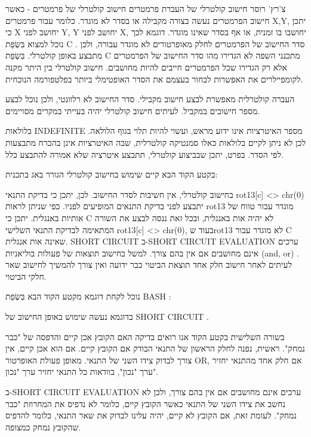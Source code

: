 \begin{טבלא}[!htbp]
        צ'רץ' רוסר
        חישוב קולטרלי של העברת פרמטרים
        חישוב קולטרלי של פרמטרים - כאשר חישוב הפרמטרים נעשה בצורה מקבילה או בסדר לא מוגדר. כלומר עבור פרמטרים X,Y, יתכן כי X יחושב לפני Y, Y יחושב לפני X, יחושבו בו זמנית, או אף בסדר שאינו מוגדר. דוגמא לכך נוכל למצוא בִּשְׂפַת C . סדר החישוב של הפרמטרים לחלק מאופרטורים לא מוגדר עבורה, ולכן מתבצע באופן קולטרלי.
        בִּשְׂפַת C מתכנני השפה לא הגדירו מהו סדר החישוב של הפרמטרים אלא רק הגדירו שכל הפרמטרים חייבים להיות מחושבים. חישוב קולטרלי בין היתר מקנה לקומפיילרים את האפשרות לבחור בעצמם את הסדר האופטימלי ביותר בפלטפורמה הנוכחית.

        העברה קולטרלית מאפשרת לבצע חישוב מקבילי. סדר החישוב לא רלוונטי, ולכן נוכל לבצע מספר חישובים במקביל. לעיתים חישוב קולטרלי יהיה בעייתי במקרים מסויימים.

        בלולאות INDEFINITE מספר האיטרציות אינו ידוע מראש, ועשוי להיות תלוי בגוף הלולאה. לכן לא ניתן לקיים בלולאות כאלו סמנטיקה קולטרלית, שבה האיטרציות אינן בהכרח מתבצעות לפי הסדר. בפרט, יתכן שבביצוע קולטרלי, תתבצע איטרציה שלא אמורה להתבצע כלל.

        בקטע הקוד הבא קיים שימוש בחישוב קולטרלי הגורר באג בתכנית:

        בחישוב קולטרלי, אין חשיבות לסדר החישוב. לכן, יתכן כי בדיקת התנאי rot13[c] <> chr(0) יתבצע לפני בדיקת התנאים המופיעים לפניו. כפי שניתן לראות rot13 מוגדר עבור טווח של אותיות באנגלית. יתכן כי C לא יהיה אות באנגלית, ובכל זאת ננסה לבצע את השורה המתאימה לבדיקת התנאי השלישי rot13[c] <> chr(0), בעוד שrot13 לא מוגדר עבור C שאינה אות אנגלית.
        SHORT CIRCUIT
        ב-SHORT CIRCUIT EVALUATION ערכים אינם מחושבים אם אין בהם צורך. למשל בחישוב תוצאות של פעולות בוליאניות (and, or) .
        לעיתים לאחר חישוב חלק אחד תוצאת הביטוי כבר ידועה ואין צורך להמשיך לחישוב שאר חלקי הביטוי.

        נוכל לקחת דוגמא מקטע הקוד הבא בִּשְׂפַת BASH :

        בדוגמא נעשה שימוש באופן החישוב של SHORT CIRCUIT .

        בשורה השלישית בקטע הקוד אנו רואים בדיקה האם הקובץ אכן קיים והדפסה של "כבר
        נמחק". ראשית, נפנה לחלק הראשון של התנאי הבודק אם הקובץ קיים. אם הוא אכן קיים,
        אין צורך לבדוק צידו השני של התנאי. מאופן פעולת האופרטור OR, אם חלק אחד מהתנאי
        יחזיר ערך "נכון", בוודאות כל התנאי יחזיר ערך "נכון".

        ב-SHORT CIRCUIT EVALUATION ערכים אינם מחושבים אם אין בהם צורך, ולכן לא נחשב את
        צידו השני של התנאי כאשר הקובץ קיים, כלומר לא נדפיס את המחרוזת "כבר נמחק". לעומת
        זאת, אם הקובץ לא קיים, יהיה עלינו לבדוק את שאר התנאי, כלומר להדפיס שהקובץ נמחק
        כמצופה.


\end{טבלא}
